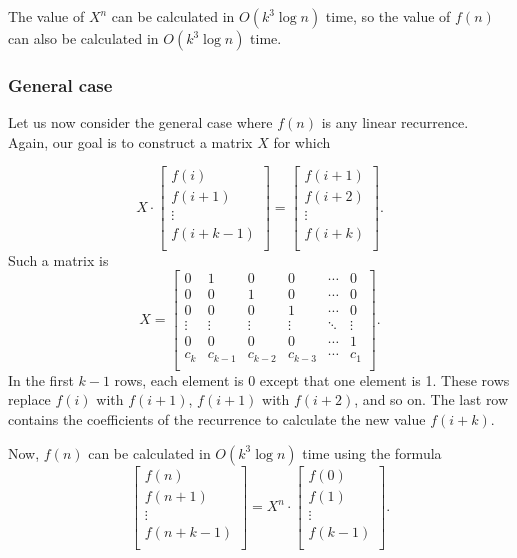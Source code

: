 The value of $X^n$ can be calculated in
$O(k^3 \log n)$ time,
so the value of $f(n)$ can also be calculated
in $O(k^3 \log n)$ time.

\subsubsection{General case}

Let us now consider the general case where
$f(n)$ is any linear recurrence.
Again, our goal is to construct a matrix $X$
for which

\[ X \cdot
 \begin{bmatrix}
  f(i) \\
  f(i+1) \\
  \vdots \\
  f(i+k-1) \\
 \end{bmatrix}
=
 \begin{bmatrix}
  f(i+1) \\
  f(i+2) \\
  \vdots \\
  f(i+k) \\
 \end{bmatrix}.
\]
Such a matrix is
\[
X =
 \begin{bmatrix}
  0 & 1 & 0 & 0 & \cdots & 0 \\
  0 & 0 & 1 & 0 & \cdots & 0 \\
  0 & 0 & 0 & 1 & \cdots & 0 \\
  \vdots & \vdots & \vdots & \vdots & \ddots & \vdots \\
  0 & 0 & 0 & 0 & \cdots & 1 \\
  c_k & c_{k-1} & c_{k-2} & c_{k-3} & \cdots & c_1 \\
 \end{bmatrix}.
\]
In the first $k-1$ rows, each element is 0
except that one element is 1.
These rows replace $f(i)$ with $f(i+1)$,
$f(i+1)$ with $f(i+2)$, and so on.
The last row contains the coefficients of the recurrence
to calculate the new value $f(i+k)$.

\begin{samepage}
Now, $f(n)$ can be calculated in
$O(k^3 \log n)$ time using the formula
\[
 \begin{bmatrix}
  f(n) \\
  f(n+1) \\
  \vdots \\
  f(n+k-1) \\
 \end{bmatrix}
=
X^n \cdot
 \begin{bmatrix}
  f(0) \\
  f(1) \\
  \vdots \\
  f(k-1) \\
 \end{bmatrix}.
\]
\end{samepage}


